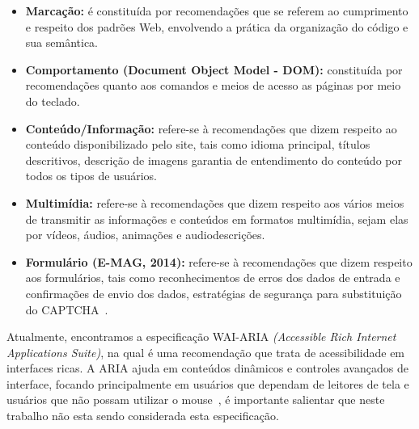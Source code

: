 \begin{itemize}
  \item \textbf{Marca\c{c}\~ao:} \'e constitu\'ida por recomenda\c{c}\~oes que
  se referem ao cumprimento e respeito dos padr\~oes Web, envolvendo a pr\'atica da organiza\c{c}\~ao do
  c\'odigo e sua sem\^antica. 
  \item \textbf{Comportamento (Document Object Model - DOM):} constitu\'ida por
  recomenda\c{c}\~oes quanto aos comandos e meios de acesso as p\'aginas por
  meio do teclado.  
  \item \textbf{Conte\'udo/Informa\c{c}\~ao:} refere-se \`a recomenda\c{c}\~oes
  que dizem respeito ao conte\'udo disponibilizado pelo site, tais como idioma principal, t\'itulos
  descritivos, descri\c{c}\~ao de imagens garantia de entendimento do conte\'udo
  por todos os tipos de usu\'arios.  
  \item \textbf{Multim\'idia:} refere-se \`a recomenda\c{c}\~oes que dizem
  respeito aos v\'arios meios de transmitir as informa\c{c}\~oes e conte\'udos em formatos
  multim\'idia, sejam elas por v\'ideos, \'audios, anima\c{c}\~oes e
  audiodescri\c{c}\~oes.
  \item \textbf{Formul\'ario (E-MAG, 2014):} refere-se \`a recomenda\c{c}\~oes
  que dizem respeito aos formul\'arios, tais como reconhecimentos de erros dos dados de
  entrada e confirma\c{c}\~oes de envio dos dados, estrat\'egias de
  seguran\c{c}a para substitui\c{c}\~ao do CAPTCHA~\cite{eMAG}.  
\end{itemize}
 
 Atualmente, encontramos a especifica\c{c}\~ao WAI-ARIA
 \emph{(Accessible Rich Internet Applications Suite)}, na qual \'e uma
 recomenda\c{c}\~ao que trata de acessibilidade em interfaces ricas. A ARIA ajuda em conte\'udos 
 din\^amicos e controles avan\c{c}ados de interface, focando principalmente
 em usu\'arios que dependam de leitores de tela e usu\'arios que n\~ao possam
 utilizar o mouse~\cite{web}, \'e importante salientar que neste trabalho n\~ao
 esta sendo considerada esta especifica\c{c}\~ao. 


